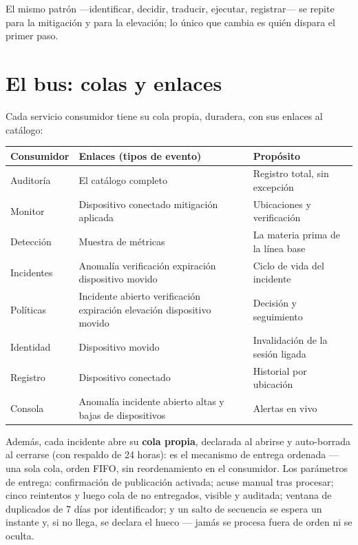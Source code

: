 \documentclass[11pt,a4paper]{article}
\begin{document}
El mismo patrón ---identificar, decidir, traducir, ejecutar, registrar--- se repite para la mitigación y para la elevación; lo único que cambia es quién dispara el primer paso.

\section{El bus: colas y enlaces}

Cada servicio consumidor tiene su cola propia, duradera, con sus enlaces al catálogo:

\begin{longtable}{p{3.2cm}p{6.4cm}p{4.4cm}}
\toprule
\textbf{Consumidor} & \textbf{Enlaces (tipos de evento)} & \textbf{Propósito}\\
\midrule
Auditoría & El catálogo completo & Registro total, sin excepción\\
Monitor & Dispositivo conectado \textperiodcentered{} mitigación aplicada & Ubicaciones y verificación\\
Detección & Muestra de métricas & La materia prima de la línea base\\
Incidentes & Anomalía \textperiodcentered{} verificación \textperiodcentered{} expiración \textperiodcentered{} dispositivo movido & Ciclo de vida del incidente\\
Políticas & Incidente abierto \textperiodcentered{} verificación \textperiodcentered{} expiración \textperiodcentered{} elevación \textperiodcentered{} dispositivo movido & Decisión y seguimiento\\
Identidad & Dispositivo movido & Invalidación de la sesión ligada\\
Registro & Dispositivo conectado & Historial por ubicación\\
Consola & Anomalía \textperiodcentered{} incidente abierto \textperiodcentered{} altas y bajas de dispositivos & Alertas en vivo\\
\bottomrule
\end{longtable}

Además, cada incidente abre su \textbf{cola propia}, declarada al abrirse y auto-borrada al cerrarse (con respaldo de 24 horas): es el mecanismo de entrega ordenada --- una sola cola, orden FIFO, sin reordenamiento en el consumidor. Los parámetros de entrega: confirmación de publicación activada; acuse manual tras procesar; cinco reintentos y luego cola de no entregados, visible y auditada; ventana de duplicados de 7 días por identificador; y un salto de secuencia se espera un instante y, si no llega, se declara el hueco --- jamás se procesa fuera de orden ni se oculta.
\end{document}

